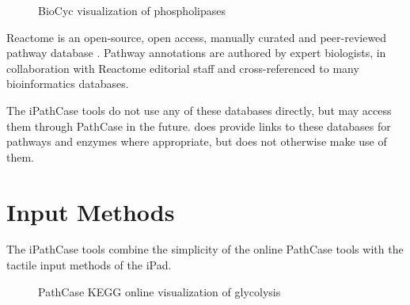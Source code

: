 \begin{figure}[hbtp]
    \caption{\label{fig:biocyc_site_viz} BioCyc visualization of phospholipases}
\end{figure}

Reactome is an open-source, open access, manually curated and peer-reviewed
pathway database \cite{reactome}. Pathway annotations are authored by expert
biologists, in collaboration with Reactome editorial staff and cross-referenced
to many bioinformatics databases.

The iPathCase tools do not use any of these databases directly, but may access
them through PathCase in the future. \keggapp does provide links to these
databases for pathways and enzymes where appropriate, but does not otherwise
make use of them.

\section{Input Methods}

The iPathCase tools combine the simplicity of the online PathCase tools with the
tactile input methods of the iPad.

\begin{figure}[hbtp]
    \caption{\label{fig:pathcase_kegg_online_viz} PathCase KEGG online
    visualization of glycolysis}
\end{figure}


